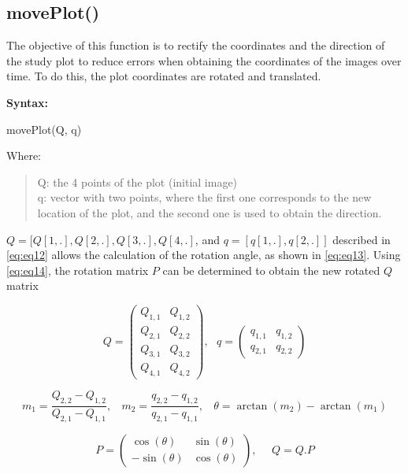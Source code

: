 \subsection{movePlot()}\label{moveplot}

The objective of this function is to rectify the coordinates and the direction of the study plot to reduce errors when obtaining the coordinates of the images over time. To do this, the plot coordinates are rotated and translated.

\textbf{Syntax:}

movePlot(Q, q)

Where:

\begin{quote}
Q: the 4 points of the plot (initial image)\\
q: vector with two points, where the first one corresponds to the new location of the plot, and the second one is used to obtain the direction.
\end{quote}

\(Q = [Q[1,.], Q[2,.], Q[3,.], Q[4,.]\), and \(q = [q[1,.], q[2,.]]\) described in \eqref{eq:eq12} allows the calculation of the rotation angle, as shown in \eqref{eq:eq13}. Using \eqref{eq:eq14}, the rotation matrix \(P\) can be determined to obtain the new rotated \(Q\) matrix

\begin{equation}
Q = \left ( \begin{array}{cc}
Q_{1, 1} & Q_{1, 2}\\
Q_{2, 1} & Q_{2, 2}\\
Q_{3, 1} & Q_{3, 2}\\
Q_{4, 1} & Q_{4, 2}\end{array}\right)
,~~~q = \left ( \begin{array}{cc} q_{1, 1} & q_{1, 2}\\
q_{2, 1} & q_{2, 2}\end{array}\right) \label{eq:eq12}
\end{equation}

\begin{equation}
m_1 = \frac{Q_{2, 2} - Q_{1, 2}}{Q_{2, 1} - Q_{1, 1}}
,~~~~m_2 = \frac{q_{2, 2} - q_{1, 2}}{q_{2, 1} - q_{1, 1}}
,~~~~\theta = \arctan(m_2) - \arctan(m_1) \label{eq:eq13}
\end{equation}

\begin{equation}
P = \left ( \begin{array}{cc}
\cos(\theta) & \sin(\theta)\\
-\sin(\theta) & \cos(\theta) \end{array}\right), ~~~~~~ Q = Q.P \label{eq:eq14}
\end{equation}

